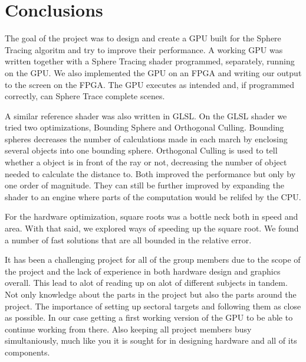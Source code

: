 \chapter{Conclusions}

	The goal of the project was to design and create a GPU built for the Sphere 
        Tracing algoritm and try to improve their performance. A working GPU was
	written together with a Sphere Tracing shader programmed, separately,
	running on the GPU. We also implemented the GPU 
	on an FPGA and writing our output to the screen on the FPGA. 
	The GPU executes as intended and, if programmed correctly,
	can Sphere Trace complete scenes.  

	 A similar reference shader was also written in GLSL. On
	the GLSL shader we tried two optimizations, Bounding Sphere and Orthogonal
	Culling. Bounding spheres decreases the number of calculations made in each 
        march by enclosing several objects into one bounding sphere. Orthogonal 
        Culling is used to tell whether a object is in front of the ray or not, 
        decreasing the number of object needed to calculate the distance to. 
        Both improved the performance but only by one order of magnitude.
	They can still be further improved by expanding the shader to an engine
	where parts of the computation would be relifed by the CPU. 
	
	For the hardware optimization, square roots was a bottle neck both in speed 
	and area. With that said, we explored ways of speeding up the square
	root. We found a number of fast solutions that are all bounded in the
	relative error. 

	It has been a challenging project for all of the group members due to the scope 
	of the project and the lack of experience in both hardware design and graphics 
	overall. This lead to alot of reading up on alot of different subjects in tandem. 
	Not only knowledge about the parts in the project but also the parts around the 
	project. The importance of setting up sectoral targets and following them as 
	close as possible. In our case getting a first working version of the GPU to be 
	able to continue working from there. Also keeping all project members busy 
	simultaniously, much like you it is sought for in designing hardware and all 
	of its components.

